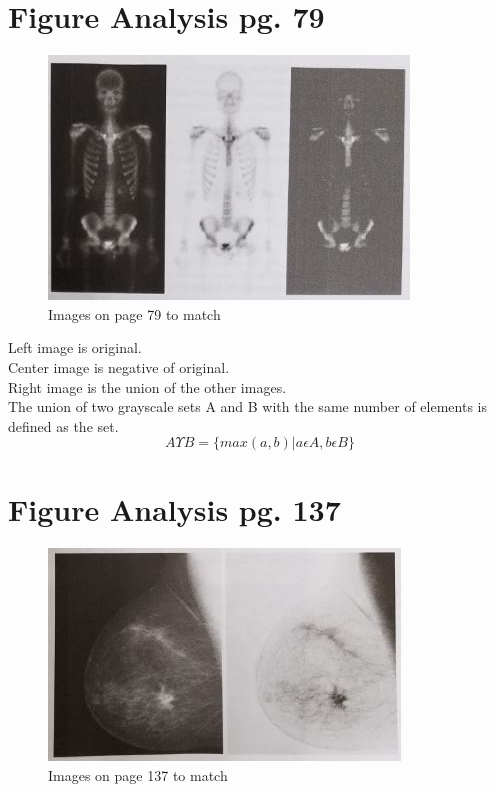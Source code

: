 \documentclass{article}
\begin{document}
\section{Figure Analysis pg. 79}


\begin{figure}[h!]
\includegraphics[scale=1.0]{pg79.jpg}
\caption{Images on page 79 to match}
\end{figure}

\noindent
Left image is original.\\
Center image is negative of original.\\
Right image is the union of the other images.\\
The union of two grayscale sets A and B with the same number of elements is defined as the set.\\
$$
A \Upsilon B = \Bigg\{ max(a,b) \big| a \epsilon A, b \epsilon B \Bigg\}
$$


\section{Figure Analysis pg. 137}


\begin{figure}[h!]
\includegraphics[scale=1.0]{pg137.jpg}
\caption{Images on page 137 to match}
\end{figure}
\end{document}
